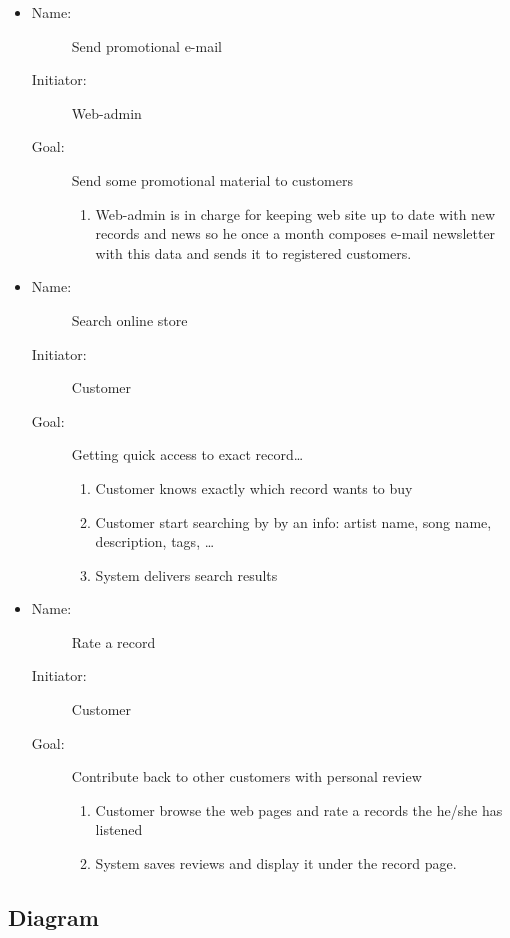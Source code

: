 \documentclass[12pt, titlepage]{article}
\begin{document}
\begin{description}
\begin{itemize}
    \item
        \begin{description}
            \item[Name:]Send promotional e-mail 
            \item[Initiator:]Web-admin 
            \item[Goal:]Send some promotional material to customers 
	    \begin{enumerate}
	    	\item Web-admin is in charge for keeping web site up to date with new records and news so he once a month composes e-mail newsletter with this data and sends it to registered customers.
	    \end{enumerate}
        \end{description}

    \item 
        \begin{description}
            \item[Name:]Search online store
		    \item[Initiator:]Customer
		    \item[Goal:]Getting quick access to exact record\dots
		    \begin{enumerate}
		    	\item Customer knows exactly which record wants to buy
			\item Customer start searching by by an info: artist name, song name, description, tags, \dots 
			\item System delivers search results
			
		    \end{enumerate}
        \end{description}
    \item 
        \begin{description}
		\item[Name:]Rate a record 
		\item[Initiator:]Customer 
		\item[Goal:]Contribute back to other customers with personal review 
			\begin{enumerate}
			\item Customer browse the web pages and rate a records the he/she has listened
			\item System saves reviews and display it under the record page.
			\end{enumerate}
        \end{description}
    \end{itemize}
\end{description}

\subsection{Diagram}
\end{document}
